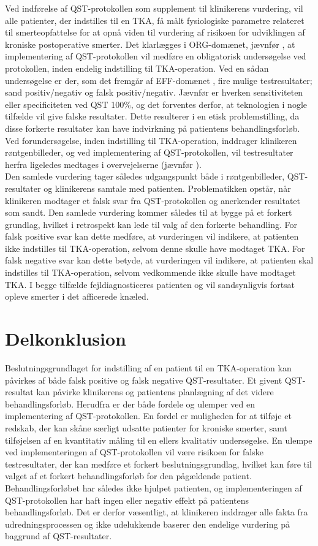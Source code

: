 Ved indførelse af QST-protokollen som supplement til klinikerens vurdering, vil alle patienter, der indstilles til en TKA, få målt fysiologiske parametre relateret til smerteopfattelse for at opnå viden til vurdering af risikoen for udviklingen af kroniske postoperative smerter. 
Det klarlægges i ORG-domænet, jævnfør , at implementering af QST-protokollen vil medføre en obligatorisk undersøgelse ved protokollen, inden endelig indstilling til TKA-operation. Ved en sådan undersøgelse er der, som det fremgår af EFF-domænet , fire mulige testresultater; sand positiv/negativ og falsk positiv/negativ. Jævnfør  er hverken sensitiviteten eller specificiteten ved QST 100\%, og det forventes derfor, at teknologien i nogle tilfælde vil give falske resultater. Dette resulterer i en etisk problemstilling, da disse forkerte resultater kan have indvirkning på patientens behandlingsforløb. 
Ved forundersøgelse, inden indstilling til TKA-operation, inddrager klinikeren røntgenbilleder, og ved implementering af QST-protokollen, vil testresultater herfra ligeledes medtages i overvejelserne (jævnfør ). \\
Den samlede vurdering tager således udgangspunkt både i røntgenbilleder, QST-resultater og klinikerens samtale med patienten. Problematikken opstår, når klinikeren modtager et falsk svar fra QST-protokollen og anerkender resultatet som sandt. Den samlede vurdering kommer således til at bygge på et forkert grundlag, hvilket i retrospekt kan lede til valg af den forkerte behandling. 
For falsk positive svar kan dette medføre, at vurderingen vil indikere, at patienten ikke indstilles til TKA-operation, selvom denne skulle have modtaget TKA.
For falsk negative svar kan dette betyde, at vurderingen vil indikere, at patienten skal indstilles til TKA-operation, selvom vedkommende ikke skulle have modtaget TKA.
I begge tilfælde fejldiagnosticeres patienten og vil sandsynligvis fortsat opleve smerter i det afficerede knæled.

\section{Delkonklusion}
Beslutningsgrundlaget for indstilling af en patient til en TKA-operation kan påvirkes af både falsk positive og falsk negative QST-resultater. Et givent QST-resultat kan påvirke klinikerens og patientens planlægning af det videre behandlingsforløb. Herudfra er der både fordele og ulemper ved en implementering af QST-protokollen. En fordel er muligheden for at tilføje et redskab, der kan skåne særligt udsatte patienter for kroniske smerter, samt tilføjelsen af en kvantitativ måling til en ellers kvalitativ undersøgelse. En ulempe ved implementeringen af QST-protokollen vil være risikoen for falske testresultater, der kan medføre et forkert beslutningsgrundlag, hvilket kan føre til valget af et forkert behandlingsforløb for den pågældende patient. Behandlingsforløbet har således ikke hjulpet patienten, og implementeringen af QST-protokollen har haft ingen eller negativ effekt på patientens behandlingsforløb. Det er derfor væsentligt, at klinikeren inddrager alle fakta fra udredningsprocessen og ikke udelukkende baserer den endelige vurdering på baggrund af QST-resultater.